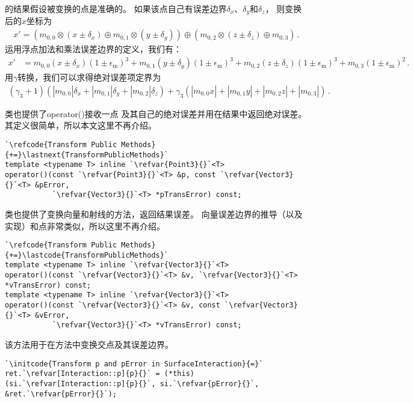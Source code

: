 的结果假设被变换的点是准确的。
如果该点自己有误差边界$\delta_x$、$\delta_y$和$\delta_z$，
则变换后的$x$坐标为
\begin{align*}
    x'=(m_{0,0}\otimes (x\pm\delta_x)\oplus m_{0,1}\otimes (y\pm\delta_y))\oplus(m_{0,2}\otimes (z\pm\delta_z)\oplus m_{0,3})\, .
\end{align*}
运用浮点加法和乘法误差边界的定义，我们有：
\begin{align*}
    x' & =m_{0,0}(x\pm\delta_x)(1\pm\epsilon_{\mathrm{m}})^3+m_{0,1}(y\pm\delta_y)(1\pm\epsilon_{\mathrm{m}})^3+m_{0,2}(z\pm\delta_z)(1\pm\epsilon_{\mathrm{m}})^3+m_{0,3}(1\pm\epsilon_{\mathrm{m}})^2\, .
\end{align*}
用$\gamma$转换，我们可以求得绝对误差项定界为
\begin{align}\label{eq:3.17}
    (\gamma_3+1)(|m_{0,0}|\delta_x+|m_{0,1}|\delta_y+|m_{0,2}|\delta_z)+\gamma_3(|m_{0,0}x|+|m_{0,1}y|+|m_{0,2}z|+|m_{0,3}|)\, .
\end{align}

类也提供了{\ttfamily operator()}接收一点
及其自己的绝对误差并用在结果中返回绝对误差。
其定义很简单，所以本文这里不再介绍。
\begin{lstlisting}
`\refcode{Transform Public Methods}{+=}\lastnext{TransformPublicMethods}`
template <typename T> inline `\refvar{Point3}{}`<T>
operator()(const `\refvar{Point3}{}`<T> &p, const `\refvar{Vector3}{}`<T> &pError,
           `\refvar{Vector3}{}`<T> *pTransError) const;
\end{lstlisting}

类也提供了变换向量和射线的方法，返回结果误差。
向量误差边界的推导（以及实现）和点非常类似，所以这里不再介绍。
\begin{lstlisting}
`\refcode{Transform Public Methods}{+=}\lastcode{TransformPublicMethods}`
template <typename T> inline `\refvar{Vector3}{}`<T>
operator()(const `\refvar{Vector3}{}`<T> &v, `\refvar{Vector3}{}`<T> *vTransError) const;
template <typename T> inline `\refvar{Vector3}{}`<T>
operator()(const `\refvar{Vector3}{}`<T> &v, const `\refvar{Vector3}{}`<T> &vError,
           `\refvar{Vector3}{}`<T> *vTransError) const;
\end{lstlisting}

该方法用于在方法中变换交点及其误差边界。
\begin{lstlisting}
`\initcode{Transform p and pError in SurfaceInteraction}{=}`
ret.`\refvar[Interaction::p]{p}{}` = (*this)(si.`\refvar[Interaction::p]{p}{}`, si.`\refvar{pError}{}`, &ret.`\refvar{pError}{}`);
\end{lstlisting}

